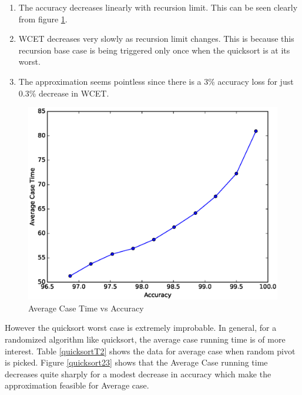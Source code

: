 \begin{enumerate}
\item The accuracy decreases linearly with recursion limit. This can be seen clearly from figure \ref{quicksort1}.
\item WCET decreases very slowly as recursion limit changes. This is because this recursion base case is being triggered only once when the quicksort is at its worst.
\item The approximation seems pointless since there is a 3\% accuracy loss for just 0.3\% decrease in WCET.
\end{enumerate}



\begin{figure}
  \includegraphics[width=0.95\linewidth]{Results/quicksort23.eps}
  \caption{Average Case Time vs Accuracy}
  \label{quicksort1}
\end{figure}

However the quicksort worst case is extremely improbable. In general, for a randomized algorithm like quicksort, the average case running time is of more interest. Table \ref{quicksortT2} shows the data for average case when random pivot is picked. Figure \ref{quicksort23} shows that the Average Case running time decreases quite sharply for a modest decrease in accuracy which make the approximation feasible for Average case.




